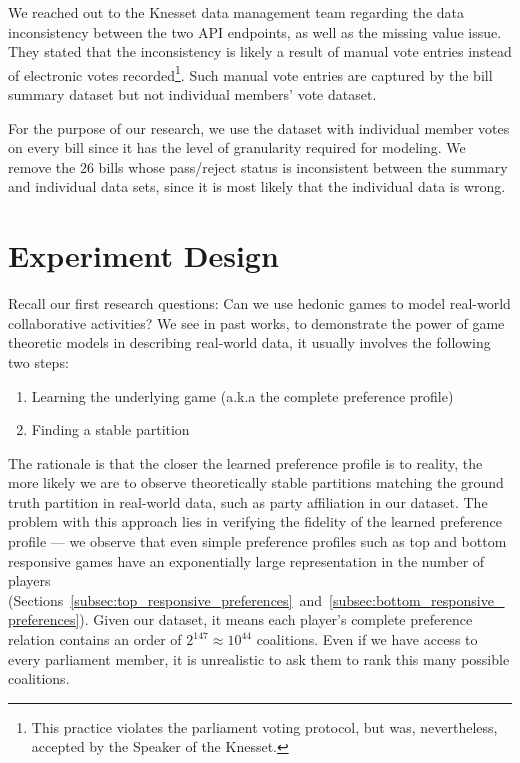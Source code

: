 We reached out to the Knesset data management team regarding the data inconsistency between
the two API endpoints, as well as the missing value issue.
They stated that the inconsistency
is likely a result of manual vote entries instead of electronic votes recorded\footnote{This practice violates the parliament voting protocol, but was, nevertheless, accepted by the Speaker of the Knesset.}.
Such manual vote entries are captured by the bill summary dataset but not individual members' vote dataset.

For the purpose of our research, we use the dataset with individual member
votes on every bill since it has the level of granularity required for modeling.
We remove the 26 bills whose pass/reject status is inconsistent between
the summary and individual data sets, since it is most likely that the individual data is wrong.


\section{Experiment Design}
\label{sec:experiment_design}

Recall our first research questions: Can we use hedonic games to model
real-world collaborative activities?
We see in past works, to demonstrate the power of game theoretic models
in describing real-world data, it usually involves the following two steps:

\begin{enumerate}
  \item Learning the underlying game (a.k.a the complete preference profile)
  \item Finding a stable partition
\end{enumerate}

The rationale is that the closer the learned preference profile is to reality,
the more likely we are to observe theoretically stable partitions matching
the ground truth partition in real-world data, such as party affiliation in
our dataset.
The problem with this approach lies in verifying the fidelity of the learned
preference profile --- we observe that even simple preference profiles such as top
and bottom responsive games have an exponentially large representation in the number of players
(Sections~\ref{subsec:top_responsive_preferences}~and~\ref{subsec:bottom_responsive_preferences}).
Given our dataset, it means each player's complete preference relation contains
an order of $2^{147} \approx 10^{44}$ coalitions.
Even if we have access to every parliament member, it is unrealistic to ask them
to rank this many possible coalitions.

